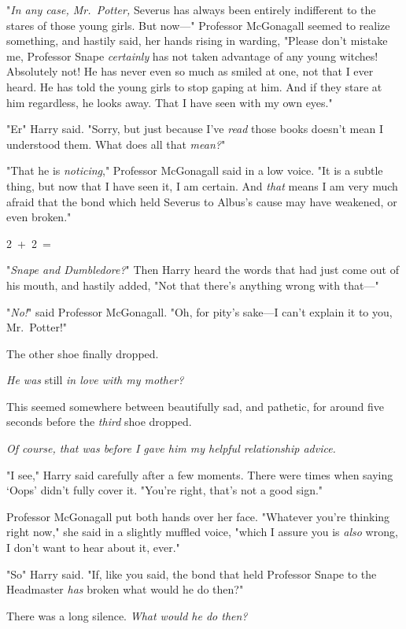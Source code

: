 "\emph{In any case, Mr.~Potter,} Severus has always been entirely indifferent
to the stares of those young girls. But now---" Professor McGonagall seemed to
realize something, and hastily said, her hands rising in warding, "Please don't
mistake me, Professor Snape \emph{certainly} has not taken advantage of any
young witches! Absolutely not! He has never even so much as smiled at one, not
that I ever heard. He has told the young girls to stop gaping at him. And if
they stare at him regardless, he looks away. That I have seen with my own eyes."

"Er{\el}" Harry said. "Sorry, but just because I've \emph{read} those books
doesn't mean I understood them. What does all that \emph{mean?}"

"That he is \emph{noticing}," Professor McGonagall said in a low voice. "It is
a subtle thing, but now that I have seen it, I am certain. And \emph{that}
means{\el} I am very much afraid{\el} that the bond which held Severus to
Albus's cause{\el} may have weakened, or even broken."

2~+~2~=~{\el}

"\emph{Snape and Dumbledore?}" Then Harry heard the words that had just come
out of his mouth, and hastily added, "Not that there's anything wrong with
that---"

"\emph{No!}" said Professor McGonagall. "Oh, for pity's sake---I can't explain
it to you, Mr.~Potter!"

The other shoe finally dropped.

\emph{He was} still \emph{in love with my mother?}

This seemed somewhere between beautifully sad, and pathetic, for around five
seconds before the \emph{third} shoe dropped.

\emph{Of course, that was before I gave him my helpful relationship advice.}

"I see," Harry said carefully after a few moments. There were times when saying
`Oops' didn't fully cover it. "You're right, that's not a good sign."

Professor McGonagall put both hands over her face. "Whatever you're thinking
right now," she said in a slightly muffled voice, "which I assure you is
\emph{also} wrong, I don't want to hear about it, ever."

"So{\el}" Harry said. "If, like you said, the bond that held Professor Snape
to the Headmaster \emph{has} broken{\el} what would he do then?"

There was a long silence.
\sbreak
\emph{What would he do then?}

